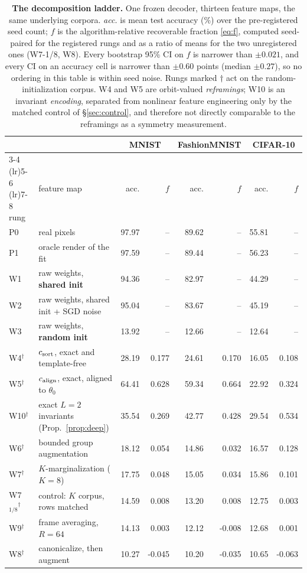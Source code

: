 \begin{table}[t]
\centering\small
\caption{\textbf{The decomposition ladder.} One frozen decoder, thirteen feature maps, the same underlying corpora. \emph{acc.} is mean test accuracy (\%) over the pre-registered seed count; $f$ is the algorithm-relative recoverable fraction \eqref{eq:f}, computed seed-paired for the registered rungs and as a ratio of means for the two unregistered ones (W7-1/8, W8). Every bootstrap 95\% CI on $f$ is narrower than $\pm0.021$, and every CI on an accuracy cell is narrower than $\pm0.60$ points (median $\pm0.27$), so no ordering in this table is within seed noise. Rungs marked $\dagger$ act on the random-initialization corpus. W4 and W5 are orbit-valued \emph{reframings}; W10 is an invariant \emph{encoding}, separated from nonlinear feature engineering only by the matched control of \S\ref{sec:control}, and therefore not directly comparable to the reframings as a symmetry measurement.}
\label{tab:ladder}
\begin{tabular}{@{}llr@{\hspace{5pt}}rr@{\hspace{5pt}}rr@{\hspace{5pt}}r@{}}
\toprule
& & \multicolumn{2}{c}{MNIST} & \multicolumn{2}{c}{FashionMNIST} & \multicolumn{2}{c}{CIFAR-10} \\
\cmidrule(lr){3-4} \cmidrule(lr){5-6} \cmidrule(lr){7-8}
rung & feature map & acc. & $f$ & acc. & $f$ & acc. & $f$ \\
\midrule
P0 & real pixels & 97.97 & -- & 89.62 & -- & 55.81 & -- \\
P1 & oracle render of the fit & 97.59 & -- & 89.44 & -- & 56.23 & -- \\
\midrule
W1 & raw weights, \textbf{shared init} & 94.36 & -- & 82.97 & -- & 44.29 & -- \\
W2 & raw weights, shared init + SGD noise & 95.04 & -- & 83.67 & -- & 45.19 & -- \\
W3 & raw weights, \textbf{random init} & 13.92 & -- & 12.66 & -- & 12.64 & -- \\
\midrule
W4$^\dagger$ & $c_{\mathrm{sort}}$, exact and template-free & 28.19 & 0.177 & 24.61 & 0.170 & 16.05 & 0.108 \\
W5$^\dagger$ & $c_{\mathrm{align}}$, exact, aligned to $\theta_0$ & 64.41 & 0.628 & 59.34 & 0.664 & 22.92 & 0.324 \\
W10$^\dagger$ & exact $L{=}2$ invariants (Prop.~\ref{prop:deep}) & 35.54 & 0.269 & 42.77 & 0.428 & 29.54 & 0.534 \\
\midrule
W6$^\dagger$ & bounded group augmentation & 18.12 & 0.054 & 14.86 & 0.032 & 16.57 & 0.128 \\
W7$^\dagger$ & $K$-marginalization ($K{=}8$) & 17.75 & 0.048 & 15.05 & 0.034 & 15.86 & 0.101 \\
W7$_{1/8}$$^\dagger$ & \quad control: $K$ corpus, rows matched & 14.59 & 0.008 & 13.20 & 0.008 & 12.75 & 0.003 \\
W9$^\dagger$ & frame averaging, $R{=}64$ & 14.13 & 0.003 & 12.12 & -0.008 & 12.68 & 0.001 \\
W8$^\dagger$ & canonicalize, then augment & 10.27 & -0.045 & 10.20 & -0.035 & 10.65 & -0.063 \\
\bottomrule
\end{tabular}
\end{table}
